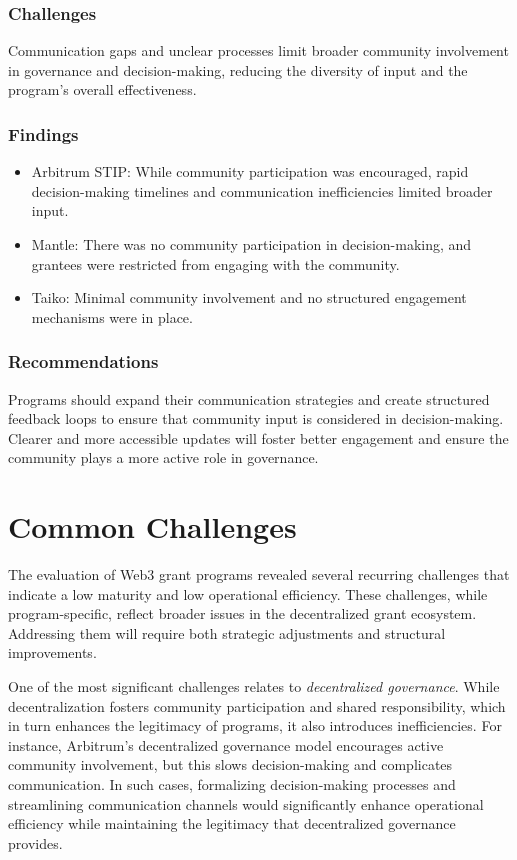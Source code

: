 \documentclass[a4,10pt]{article}
\begin{document}
\subsubsection{Challenges}\label{sec_9.6.1}
Communication gaps and unclear processes limit broader community involvement in governance and decision-making, reducing the diversity of input and the program's overall effectiveness.

\subsubsection{Findings}\label{sec_9.6.2}
\begin{itemize}
    \item Arbitrum STIP: While community participation was encouraged, rapid decision-making timelines and communication inefficiencies limited broader input.
    \item Mantle: There was no community participation in decision-making, and grantees were restricted from engaging with the community.
    \item Taiko: Minimal community involvement and no structured engagement mechanisms were in place.
\end{itemize}

\subsubsection{Recommendations}\label{sec_9.6.3}
Programs should expand their communication strategies and create structured feedback loops to ensure that community input is considered in decision-making. Clearer and more accessible updates will foster better engagement and ensure the community plays a more active role in governance.

\section{Common Challenges}\label{sec_10}
The evaluation of Web3 grant programs revealed several recurring challenges that indicate a low maturity and low operational efficiency. These challenges, while program-specific, reflect broader issues in the decentralized grant ecosystem. Addressing them will require both strategic adjustments and structural improvements.

One of the most significant challenges relates to \textit{decentralized governance}. While decentralization fosters community participation and shared responsibility, which in turn enhances the legitimacy of programs, it also introduces inefficiencies. For instance, Arbitrum’s decentralized governance model encourages active community involvement, but this slows decision-making and complicates communication. In such cases, formalizing decision-making processes and streamlining communication channels would significantly enhance operational efficiency while maintaining the legitimacy that decentralized governance provides.
\end{document}
